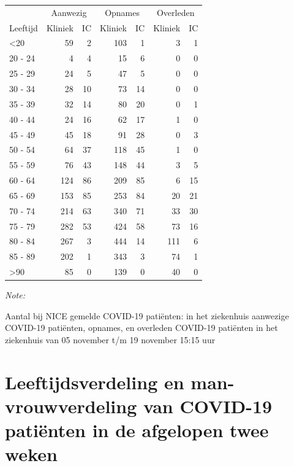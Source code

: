 \documentclass[
  english,
  man,floatsintext]{apa6}
\begin{document}
\begin{table}
\centering\begingroup\fontsize{10}{12}\selectfont

\begin{threeparttable}
\begin{tabular}{lrrrrrr}
\toprule
\multicolumn{1}{c}{ } & \multicolumn{2}{c}{Aanwezig} & \multicolumn{2}{c}{Opnames} & \multicolumn{2}{c}{Overleden} \\
\cmidrule(l{3pt}r{3pt}){2-3} \cmidrule(l{3pt}r{3pt}){4-5} \cmidrule(l{3pt}r{3pt}){6-7}
Leeftijd & Kliniek & IC & Kliniek & IC & Kliniek & IC\\
\midrule
<20 & 59 & 2 & 103 & 1 & 3 & 1\\
20 - 24 & 4 & 4 & 15 & 6 & 0 & 0\\
25 - 29 & 24 & 5 & 47 & 5 & 0 & 0\\
30 - 34 & 28 & 10 & 73 & 14 & 0 & 0\\
35 - 39 & 32 & 14 & 80 & 20 & 0 & 1\\
40 - 44 & 24 & 16 & 62 & 17 & 1 & 0\\
45 - 49 & 45 & 18 & 91 & 28 & 0 & 3\\
50 - 54 & 64 & 37 & 118 & 45 & 1 & 0\\
55 - 59 & 76 & 43 & 148 & 44 & 3 & 5\\
60 - 64 & 124 & 86 & 209 & 85 & 6 & 15\\
65 - 69 & 153 & 85 & 253 & 84 & 20 & 21\\
70 - 74 & 214 & 63 & 340 & 71 & 33 & 30\\
75 - 79 & 282 & 53 & 424 & 58 & 73 & 16\\
80 - 84 & 267 & 3 & 444 & 14 & 111 & 6\\
85 - 89 & 202 & 1 & 343 & 3 & 74 & 1\\
>90 & 85 & 0 & 139 & 0 & 40 & 0\\
\bottomrule
\end{tabular}
\begin{tablenotes}
\item \textit{Note: } 
\item Aantal bij NICE gemelde COVID-19 patiënten: in het ziekenhuis aanwezige COVID-19 patiënten, opnames, en overleden COVID-19 patiënten in het ziekenhuis van 05 november t/m 19 november 15:15 uur
\end{tablenotes}
\end{threeparttable}
\endgroup{}
\end{table}

\newpage

\hypertarget{leeftijdsverdeling-en-man-vrouwverdeling-van-covid-19-patiuxebnten-in-de-afgelopen-twee-weken}{%
\section{Leeftijdsverdeling en man-vrouwverdeling van COVID-19 patiënten in de afgelopen twee weken}\label{leeftijdsverdeling-en-man-vrouwverdeling-van-covid-19-patiuxebnten-in-de-afgelopen-twee-weken}}
\end{document}
